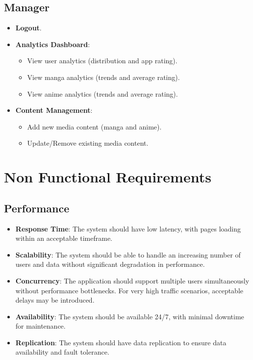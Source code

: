 \subsection*{Manager}

\begin{itemize}
    \item \textbf{Logout}.
    
    \item \textbf{Analytics Dashboard}:
    \begin{itemize}
        \item View user analytics (distribution and app rating).
        \item View manga analytics (trends and average rating).
        \item View anime analytics (trends and average rating).
    \end{itemize}
    
    \item \textbf{Content Management}:
    \begin{itemize}
        \item Add new media content (manga and anime).
        \item Update/Remove existing media content.
    \end{itemize}
\end{itemize}

\section{Non Functional Requirements}

\subsection*{Performance}

\begin{itemize}
    \item \textbf{Response Time}: The system should have low latency, with pages loading within an acceptable timeframe.
    
    \item \textbf{Scalability}: The system should be able to handle an increasing number of users and data without significant degradation in performance.
    
    \item \textbf{Concurrency}: The application should support multiple users simultaneously without performance bottlenecks. For very high traffic scenarios, acceptable delays may be introduced.
    
    \item \textbf{Availability}: The system should be available 24/7, with minimal downtime for maintenance.
    
    \item \textbf{Replication}: The system should have data replication to ensure data availability and fault tolerance.
\end{itemize}

